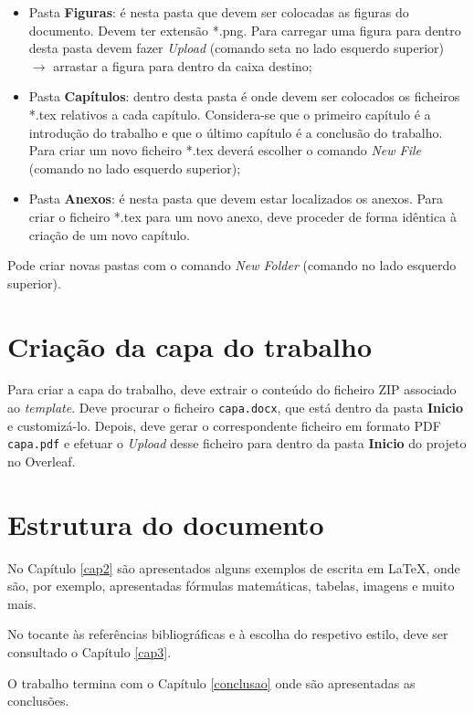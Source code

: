 \begin{itemize}
        \item Pasta \textbf{Figuras}: é nesta pasta que devem ser colocadas as figuras do documento. Devem ter extensão *.png. Para carregar uma figura para dentro desta pasta devem fazer \textit{Upload} (comando seta no lado esquerdo superior) $\rightarrow$ arrastar a figura para dentro da caixa destino;
    
        \item Pasta \textbf{Capítulos}: dentro desta pasta é onde devem ser colocados os ficheiros *.tex relativos a cada capítulo. Considera-se que o primeiro capítulo é a introdução do trabalho e que o último capítulo é a conclusão do trabalho. Para criar um novo ficheiro *.tex deverá escolher o comando \textit{New File} (comando no lado esquerdo superior);
    
        \item Pasta \textbf{Anexos}: é nesta pasta que devem estar localizados os anexos. Para criar o ficheiro *.tex para um novo anexo, deve proceder de forma idêntica à criação de um novo capítulo.
        
    \end{itemize}
    
    Pode criar novas pastas com o comando \textit{New Folder} (comando no lado esquerdo superior).

\section{Criação da capa do trabalho}

    Para criar a capa do trabalho, deve extrair o conteúdo do ficheiro ZIP associado ao \textit{template}. Deve procurar o ficheiro 
    \verb|capa.docx|, que está dentro da pasta \textbf{Inicio} e customizá-lo. Depois, deve gerar o correspondente ficheiro em formato PDF \verb|capa.pdf| e efetuar o \textit{Upload} desse ficheiro para dentro da pasta \textbf{Inicio} do projeto no Overleaf.
    
\section{Estrutura do documento}
    No Capítulo \ref{cap2} são apresentados alguns exemplos de escrita em \LaTeX, onde são, por exemplo, apresentadas fórmulas matemáticas, tabelas, imagens e muito mais.
    
    No tocante às referências bibliográficas e à escolha do respetivo estilo, deve ser consultado o Capítulo \ref{cap3}.
    
    O trabalho termina com o Capítulo \ref{conclusao} onde são apresentadas as conclusões.